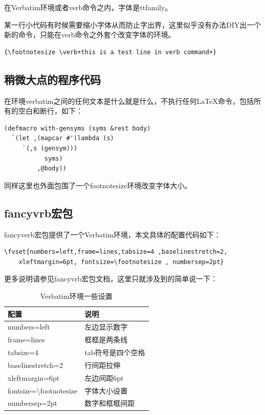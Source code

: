 \documentclass[12pt,oneside]{book}
\begin{document}
\begin{common-format}
在Verbatim环境或者verb命令之内，字体是ttfamily。

某一行小代码有时候需要缩小字体从而防止字出界，这里似乎没有办法DIY出一个新的命令，只能在verb命令之外套个改变字体的环境。
\begin{Verbatim}
{\footnotesize \verb+this is a test line in verb command+}
\end{Verbatim}



\subsection{稍微大点的程序代码}
在环境verbatim之间的任何文本是什么就是什么，不执行任何\LaTeX 命令，包括所有的空白和断行，如下：
\begin{footnotesize}
\begin{verbatim}
(defmacro with-gensyms (syms &rest body)
  `(let ,(mapcar #'(lambda (s)
     `(,s (gensym)))
           syms)
         ,@body))
\end{verbatim}
\end{footnotesize}
同样这里也外面包围了一个footnotesize环境改变字体大小。


\subsection{fancyvrb宏包}
fancyverb宏包提供了一个Verbatim环境，本文具体的配置代码如下：
\begin{Verbatim}
\fvset{numbers=left,frame=lines,tabsize=4 ,baselinestretch=2,
    xleftmargin=6pt, fontsize=\footnotesize , numbersep=2pt}
\end{Verbatim}

更多说明请参见fancyvrb宏包文档，这里只就涉及到的简单说一下：
\begin{table}[H]
\centering
\caption{Verbatim环境一些设置}
\label{tab:Verbatim环境一些设置}
\medskip 
\begin{tabular}{@{}ll@{}}
\toprule
配置                        & 说明     \\ \midrule
numbers=left                         & 左边显示数字     \\
frame=lines                          & 框框是两条线     \\
tabsize=4                            & tab符号是四个空格 \\
baselinestretch=2                    & 行间距拉伸      \\
xleftmargin=6pt                      & 左边间距6pt    \\
fontsize=\textbackslash footnotesize & 字体大小设置     \\  
numbersep=2pt                        & 数字和框框间距 \\   \bottomrule
\end{tabular}
\end{table}



\end{common-format}
\end{document}
